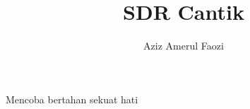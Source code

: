 \documentclass[4pt,a4paper,twoside]{book}
\author{Aziz Amerul Faozi}
\title{SDR Cantik}
\begin{document}
Mencoba bertahan sekuat hati
\end{document}

